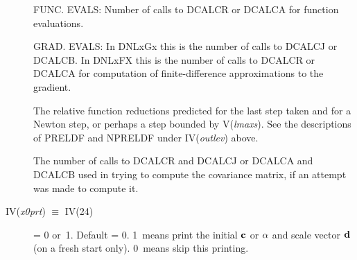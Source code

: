 \documentclass[twoside]{MATH77}
\begin{document}
\begin{description}
FUNC. EVALS: Number of calls to DCALCR or DCALCA for function
evaluations.

GRAD. EVALS: In DNLxGx this is the number of calls to DCALCJ or
DCALCB.  In DNLxFX this is the number of calls to DCALCR or DCALCA for
computation of finite-difference approximations to the gradient.

The relative function reductions predicted for the last step taken and
for a Newton step, or perhaps a step bounded by V({\em lmaxs}). See
the descriptions of PRELDF and NPRELDF under IV({\em outlev}) above.

The number of calls to DCALCR and DCALCJ or DCALCA and DCALCB used in
trying to compute the covariance matrix, if an attempt was made to
compute it.

\item[IV({\em x0prt}) $\equiv $ IV(24)] = 0 or~1. Default = 0. 1~means
  print the initial ${\bf c}$ or ${\bf \alpha }$ and scale vector
  ${\bf d}$ (on a fresh start only). 0~means skip this printing.
\end{description}
\end{document}
